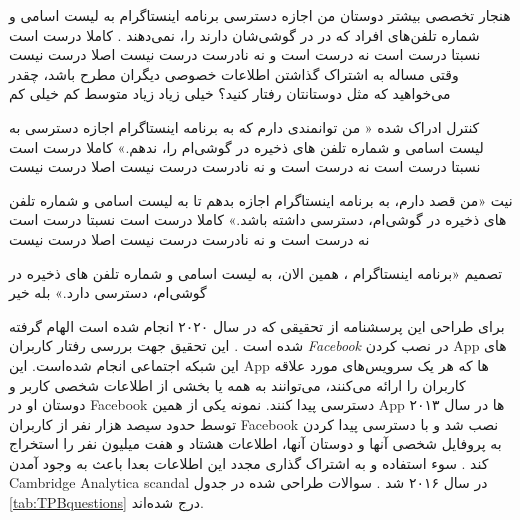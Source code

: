 هنجار تخصصی
بیشتر دوستان من اجازه دسترسی برنامه اینستاگرام به لیست اسامی و شماره تلفن‌‌های افراد که در در گوشی‌شان دارند را، نمی‌دهند . 
کاملا درست است
نسبتا درست است
نه درست است و نه نادرست
درست نیست
اصلا درست نیست
وقتی مساله به اشتراک گذاشتن اطلاعات خصوصی دیگران مطرح باشد، چقدر می‌خواهید که
مثل دوستانتان رفتار کنید؟ 
خیلی زیاد
زیاد
متوسط
کم
خیلی کم

کنترل ادراک شده
« من توانمندی دارم که به برنامه اینستاگرام اجازه دسترسی به لیست اسامی و شماره تلفن های ذخیره در گوشی‌ام را، ندهم.» 
کاملا درست است
نسبتا درست است
نه درست است و نه نادرست
درست نیست
اصلا درست نیست

نیت
«من قصد دارم، به برنامه اینستاگرام اجازه بدهم تا به لیست اسامی و شماره تلفن های ذخیره در گوشی‌ام، دسترسی داشته باشد.» 
کاملا درست است
نسبتا درست است
نه درست است و نه نادرست
درست نیست
اصلا درست نیست

تصمیم
«برنامه اینستاگرام ، همین الان، به لیست اسامی و شماره تلفن های ذخیره در گوشی‌ام، دسترسی دارد.» 
بله
خیر

برای طراحی این پرسشنامه از تحقیقی که در سال ۲۰۲۰ انجام شده است الهام گرفته شده است
\!\citep{vanderschyffInformationPrivacyBehavior2020a}.
این تحقیق جهت بررسی رفتار کاربران
\textit{\gls{Facebook}}
در نصب  کردن
\gls{App}
\!‌های
این شبکه اجتماعی انجام شده‌است. این
\gls{App}
\!‌ها
که هر یک سرویس‌های مورد علاقه کاربران را ارائه می‌کنند، می‌توانند به همه یا بخشی از اطلاعات شخصی
کاربر و دوستان او در
\gls{Facebook}
دسترسی پیدا کنند. نمونه یکی از همین
\gls{App}
\!‌ها
در سال ۲۰۱۳ توسط حدود سیصد هزار نفر از کاربران
\gls{Facebook}
نصب شد و با دسترسی پیدا کردن به پروفایل شخصی آنها و دوستان آنها،
اطلاعات هشتاد و هفت میلیون‌ نفر را استخراج کند
\citep{confessoreCambridgeAnalyticaFacebook2018,salinasZuckerbergCambridgeAnalytica,smithThereOpenSecret}.
سوء استفاده و به اشتراک گذاری مجدد این اطلاعات بعدا باعث
به وجود آمدن
\gls{Cambridge Analytica scandal}
در سال ۲۰۱۶ شد
\!\citep{gonzalezGlobalReactionsCambridge2019,SuspendingCambridgeAnalytica2018}.
سوالات طراحی شده در جدول
\eqref{tab:TPBquestions}
درج شده‌اند.

